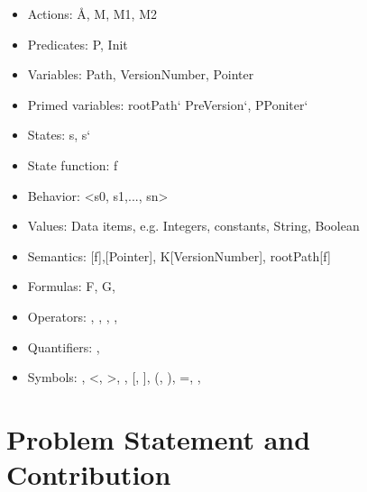 \documentclass[11pt,a4paper,oneside]{book} %
\numberwithin{equation}{section}
\begin{document}
\begin{itemize}
\item Actions: Å, M, M1, M2
\item Predicates: P, Init \baro
\item Variables: Path, VersionNumber, Pointer
\item Primed variables: rootPath` PreVersion`, PPoniter`
\item States: s, s`
\item State function: f
\item Behavior: <s0, s1,..., sn>
\item Values: Data items, e.g. Integers, constants, String, Boolean
\item Semantics: [f],[Pointer], K[VersionNumber], rootPath[f]
\item Formulas: F, G, \textPhi
\item Operators: \Box, \diamond, \neq, \vee, \wedge %
\item Quantifiers: \forall, \exists %
\item Symbols:  \triangleq, <, >, \backsim, [, ], (, ), =, \equiv, \cdots

\end{itemize}

\section{Problem Statement and Contribution}


\end{document}

